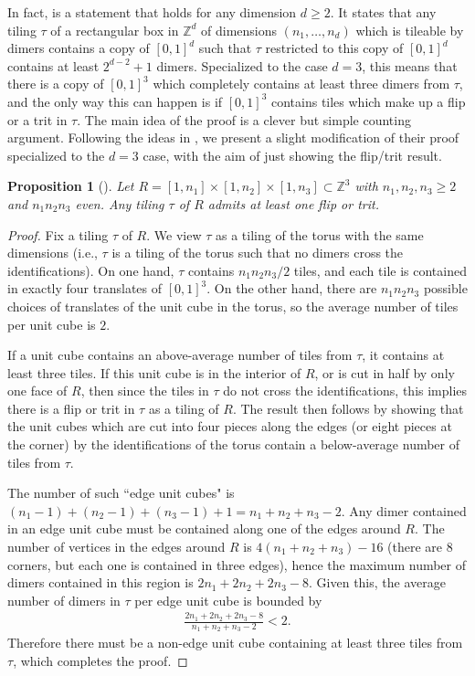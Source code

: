 \documentclass[11pt]{article}
\newtheorem{prop}[thm]{Proposition}
\theoremstyle{remark}
\theoremstyle{definition}
\newcommand{\m}[1]{\mathbb{#1}}
\begin{document}
In fact, \cite[Theorem 3]{localdimer} is a statement that holds for any dimension $d\geq 2$. It states that any tiling $\tau$ of a rectangular box in $\m Z^d$ of dimensions $(n_1, \dots, n_d)$ which is tileable by dimers contains a copy of $[0,1]^d$ such that $\tau$ restricted to this copy of $[0,1]^d$ contains at least $2^{d-2}+1$ dimers. Specialized to the case $d=3$, this means that there is a copy of $[0,1]^3$ which completely contains at least three dimers from $\tau$, and the only way this can happen is if $[0,1]^3$ contains tiles which make up a flip or a trit in $\tau$. The main idea of the proof is a clever but simple counting argument. Following the ideas in \cite{localdimer}, we present a slight modification of their proof specialized to the $d=3$ case, with the aim of just showing the flip/trit result. 
\begin{prop}[\cite{localdimer}]
    Let $R=[1,n_1]\times[1,n_2]\times[1,n_3]\subset \m Z^3$ with $n_1,n_2,n_3\geq 2$ and $n_1n_2n_3$ even. Any tiling $\tau$ of $R$ admits at least one flip or trit. 
\end{prop}
\begin{proof}
    Fix a tiling $\tau$ of $R$. We view $\tau$ as a tiling of the torus with the same dimensions (i.e., $\tau$ is a tiling of the torus such that no dimers cross the identifications). On one hand, $\tau$ contains $n_1n_2n_3/2$ tiles, and each tile is contained in exactly four translates of $[0,1]^3$. On the other hand, there are $n_1n_2n_3$ possible choices of translates of the unit cube in the torus, so the average number of tiles per unit cube is $2$. 

    If a unit cube contains an above-average number of tiles from $\tau$, it contains at least three tiles. If this unit cube is in the interior of $R$, or is cut in half by only one face of $R$, then since the tiles in $\tau$ do not cross the identifications, this implies there is a flip or trit in $\tau$ as a tiling of $R$. The result then follows by showing that the unit cubes which are cut into four pieces along the edges (or eight pieces at the corner) by the identifications of the torus contain a below-average number of tiles from $\tau$.

    The number of such ``edge unit cubes" is $(n_1-1)+(n_2-1)+(n_3-1) + 1 = n_1 + n_2 + n_3 -2$. Any dimer contained in an edge unit cube must be contained along one of the edges around $R$. The number of vertices in the edges around $R$  is $4(n_1+n_2+n_3) - 16$ (there are $8$ corners, but each one is contained in three edges), hence the maximum number of dimers contained in this region is $2 n_1 + 2 n_2 + 2 n_3 - 8$. Given this, the average number of dimers in $\tau$ per edge unit cube is bounded by
    \begin{align*}
          \frac{2n_1+2n_2+2n_3-8}{n_1 + n_2 + n_3 -2} < 2.
    \end{align*}
    Therefore there must be a non-edge unit cube containing at least three tiles from $\tau$, which completes the proof.
\end{proof}
\end{document}
